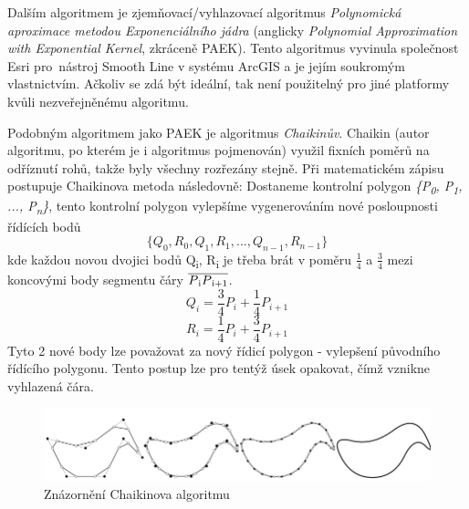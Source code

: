 Dalším algoritmem je zjemňovací/vyhlazovací algoritmus \textit{Polynomická aproximace metodou Exponenciálního jádra}
(anglicky \textit{Polynomial Approximation with Exponential Kernel}, zkráceně PAEK).
Tento algoritmus vyvinula společnost Esri pro~nástroj Smooth Line v systému ArcGIS a je jejím soukromým vlastnictvím.
Ačkoliv se zdá být ideální, tak není použitelný pro jiné platformy kvůli nezveřejněnému algoritmu.

Podobným algoritmem jako PAEK je algoritmus \textit{Chaikinův}. 
Chaikin (autor algoritmu, po kterém je i algoritmus pojmenován) využil fixních poměrů na odříznutí rohů, takže byly všechny rozřezány stejně. 
Při matematickém zápisu postupuje Chaikinova metoda následovně: Dostaneme kontrolní polygon 
\textit{\{P\textsubscript{0}, P\textsubscript{1}, ..., P\textsubscript{n}\}},
tento kontrolní polygon vylepšíme vygenerováním nové posloupnosti řídících bodů 
\[ \{Q_0, R_0, Q_1, R_1, ...,  Q_{n−1}, R_{n−1}\} \]                                    
kde každou novou dvojici bodů Q\textsubscript{i}, R\textsubscript{i} je třeba brát v poměru \(\frac{1}{4}\)
a \(\frac{3}{4}\) mezi koncovými body segmentu čáry \(\overline{P\textsubscript{i}P\textsubscript{i+1}}\).
\[Q_i = \frac{3}{4}P_i + \frac{1}{4}P_{i+1}\]
\[R_i = \frac{1}{4}P_i + \frac{3}{4}P_{i+1}\]
Tyto 2 nové body lze považovat za nový řídicí polygon - vylepšení původního řídícího polygonu. 
Tento postup lze pro tentýž úsek opakovat, čímž vznikne vyhlazená čára. \cite{chaikin} 

\begin{figure}[H] \centering
    \includegraphics[width=400pt]{./pictures/chaiken.png}
    \caption[Znázornění Chaikinova algoritmu]{Znázornění Chaikinova algoritmu \cite{bayer-douglas}}
	\label{fig:chaiken}              
\end{figure} 